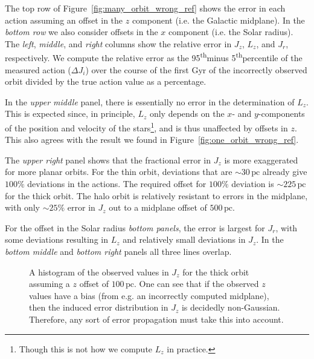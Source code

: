 \documentclass[twocolumn]{aastex62}
\newcommand{\pc}{\text{pc}}
\newcommand{\Gyr}{\text{Gyr}}
\newcommand{\uth}{\textsuperscript{th}}
\begin{document}
The top row of Figure~\ref{fig:many_orbit_wrong_ref} shows the error in each
action assuming an offset in the $z$ component (i.e. the Galactic midplane).
In the {\em bottom row} we also consider offsets in the $x$ component (i.e.
the Solar radius). The {\em left}, {\em middle}, and {\em right} columns show
the relative error in $J_z$, $L_z$, and $J_r$, respectively. We compute the
relative error as the  95\uth minus 5\uth percentile of the measured action
($\Delta J_i$) over the course of the first $\Gyr$ of the incorrectly observed
orbit divided by the true action value as a percentage.

In the {\em upper middle} panel, there is essentially no error in the
determination of $L_z$. This is expected since, in principle, $L_z$ only
depends on the $x$- and $y$-components of the position and velocity of the
stars\footnote{Though this is not how we compute $L_z$ in practice.}, and is
thus unaffected by offsets in $z$. This also agrees with the result we found
in Figure~\ref{fig:one_orbit_wrong_ref}.

The {\em upper right} panel shows that the fractional error in $J_z$ is more
exaggerated for more planar orbits. For the thin orbit, deviations that are
$\sim30\,\pc$ already give $100\%$ deviations in the actions. The required
offset for $100\%$ deviation is $\sim225\,\pc$ for the thick orbit. The halo
orbit is relatively resistant to errors in the midplane, with only $\sim25\%$
error in $J_z$ out to a midplane offset of $500\,\pc$.

For the offset in the Solar radius {\em bottom panels}, the error is largest
for $J_r$, with some deviations resulting in $L_z$ and relatively small
deviations in $J_z$. In the {\em bottom middle} and {\em bottom right} panels
all three lines overlap.

\begin{figure*}
\caption{We report the 95\uth minus 5\uth percentile of the error in the
measured action ($\Delta J_i$) from coordinate system errors for the thin,
thick, and halo orbits (Table~\ref{tab:orbits}). The {\em left}, {\em center},
and {\em right} panels show the result for $J_r$, $L_z$, and $J_z$,
respectively. The {\em upper} panels consider an offset in $z$ and the {\em
lower} panels consider an offset in $x$ (equivalently, an offset in the Solar
radius).}
\label{fig:many_orbit_wrong_ref}
\end{figure*}

\begin{figure}
\caption{A histogram of the observed values in $J_z$ for the thick orbit
assuming a $z$ offset of $100\,\pc$. One can see that if the observed $z$
values have a bias (from e.g. an incorrectly computed midplane), then the
induced error distribution in $J_z$ is decidedly non-Gaussian. Therefore, any
sort of error propagation must take this into account.}
\label{fig:Jz_hist}
\end{figure}
\end{document}
